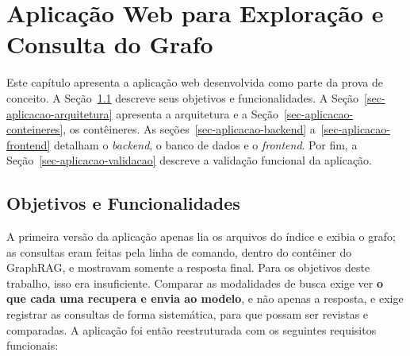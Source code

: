 \chapter{Aplicação Web para Exploração e Consulta do Grafo}
\label{sec-aplicacao}

Este capítulo apresenta a aplicação web desenvolvida como parte da prova de conceito. A Seção~\ref{sec-aplicacao-requisitos} descreve seus objetivos e funcionalidades. A Seção~\ref{sec-aplicacao-arquitetura} apresenta a arquitetura e a Seção~\ref{sec-aplicacao-conteineres}, os contêineres. As seções~\ref{sec-aplicacao-backend} a~\ref{sec-aplicacao-frontend} detalham o \textit{backend}, o banco de dados e o \textit{frontend}. Por fim, a Seção~\ref{sec-aplicacao-validacao} descreve a validação funcional da aplicação.

\section{Objetivos e Funcionalidades}
\label{sec-aplicacao-requisitos}

A primeira versão da aplicação apenas lia os arquivos do índice e exibia o grafo; as consultas eram feitas pela linha de comando, dentro do contêiner do GraphRAG, e mostravam somente a resposta final. Para os objetivos deste trabalho, isso era insuficiente. Comparar as modalidades de busca exige ver \textbf{o que cada uma recupera e envia ao modelo}, e não apenas a resposta, e exige registrar as consultas de forma sistemática, para que possam ser revistas e comparadas. A aplicação foi então reestruturada com os seguintes requisitos funcionais:

